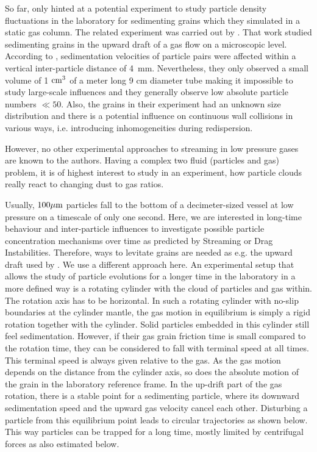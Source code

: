 {So far, only} \citet{Lambrechts2016} hinted at a potential experiment to study particle density fluctuations in the laboratory for sedimenting grains which they simulated in a static gas column. The related experiment was carried out by \citet{Capelo2018}. That work studied sedimenting grains in the upward draft of a gas flow on a microscopic level. 
{According to  \citet{Capelo2018}, sedimentation velocities of particle pairs were affected within a vertical inter-particle distance of 4~mm. {Nevertheless, they only observed a small volume of 1 $\rm cm^3$ of a meter long 9 cm diameter tube making it impossible to study large-scale influences} and they generally observe low absolute particle numbers $\ll 50$. Also, the grains in their experiment had an unknown size distribution and there is a potential influence on continuous wall collisions in various ways, i.e. introducing inhomogeneities during redispersion. 
}
 
However, no other experimental approaches to streaming in low pressure gases are known to the authors.
 Having a complex two fluid (particles and gas) problem, it is of highest interest to
study in an experiment, how particle clouds really react {to changing dust to gas ratios.} 



{Usually, {$\rm 100 \mu m$ particles fall to the bottom of a de\-ci\-me\-ter-sized vessel at low pressure on a timescale of only one second. Here, we are interested in long-time behaviour and in\-ter-par\-ticle influences to investigate possible particle concentration mechanisms over time as pre\-dic\-ted by Streaming or Drag Instabilities.} Therefore, ways to levitate grains are needed as e.g. the upward draft used by \citet{Capelo2018}. We use a different approach here. An experimental setup that allows the study of particle evolutions for {a} longer time in the laboratory in a more defined way is a rotating cylinder with the cloud of particles and gas within. The rotation axis has to be horizontal. In such a rotating cylinder with no-slip boundaries at the cylinder mantle, the gas motion in equilibrium is simply a rigid rotation together with the cylinder. Solid particles embedded in this cylinder still feel sedimentation. However, if their gas grain friction time is small compared to the rotation time, they can be considered to fall with terminal speed at all times. This terminal speed is always given relative to the gas. As the gas motion depends on the distance from the cylinder axis, so does the absolute motion of the grain in the laboratory reference frame.}
In the up-drift part of the gas rotation, there is a stable point for a sedimenting particle, where its downward sedimentation speed and the upward gas velocity cancel each other.
{Disturbing a particle from this equilibrium point leads to circular trajectories as shown below. This way particles can be trapped for {a} long time, mostly limited by centrifugal forces as also estimated below.}

